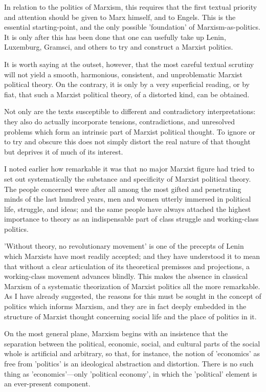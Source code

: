 In relation to the politics of Marxism, this requires that the first textual priority and attention should be given to Marx himself, and to Engels. This is the essential starting-point, and the only possible 'foundation' of Marxism-as-politics. It is only after this has been done that one can usefully take up Lenin, Luxemburg, Gramsci, and others to try and construct a Marxist politics.

It is worth saying at the outset, however, that the most careful textual scrutiny will not yield a smooth, harmonious, consistent, and unproblematic Marxist political theory. On the contrary, it is only by a very superficial reading, or by fiat, that such a Marxist political theory, of a distorted kind, can be obtained.

Not only are the texts susceptible to different and contradictory interpretations: they also do actually incorporate tensions, contradictions, and unresolved problems which form an intrinsic part of Marxist political thought. To ignore or to try and obscure this does not simply distort the real nature of that thought but deprives it of much of its interest.

I noted earlier how remarkable it was that no major Marxist figure had tried to set out systematically the substance and specificity of Marxist political theory. The people concerned were after all among the most gifted and penetrating minds of the last hundred years, men and women utterly immersed in political life, struggle, and ideas; and the same people have always attached the highest importance to theory as an indispensable part of class struggle and working-class politics.

'Without theory, no revolutionary movement' is one of the precepts of Lenin which Marxists have most readily accepted; and they have understood it to mean that without a clear articulation of its theoretical premisses and projections, a working-class movement advances blindly. This makes the absence in classical Marxism of a systematic theorization of Marxist politics all the more remarkable. As I have already suggested, the reasons for this must be sought in the concept of politics which informs Marxism, and they are in fact deeply embedded in the structure of Marxist thought concerning social life and the place of politics in it.

On the most general plane, Marxism begins with an insistence that the separation between the political, economic, social, and cultural parts of the social whole is artificial and arbitrary, so that, for instance, the notion of 'economics' as free from 'politics' is an ideological abstraction and distortion. There is no such thing as 'economics'—only 'political economy', in which the 'political' element is an ever-present component.

